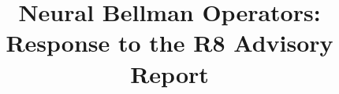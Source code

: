 \documentclass[ecta,draft]{econsocart}
\begin{document}
\begin{frontmatter}
\title{Neural Bellman Operators: Response to the R8 Advisory Report}
\begin{aug}
\author[id=au1,addressref={add1}]{~}
\address[id=add1]{Peking University}
\end{aug}
\end{frontmatter}

\end{document}
